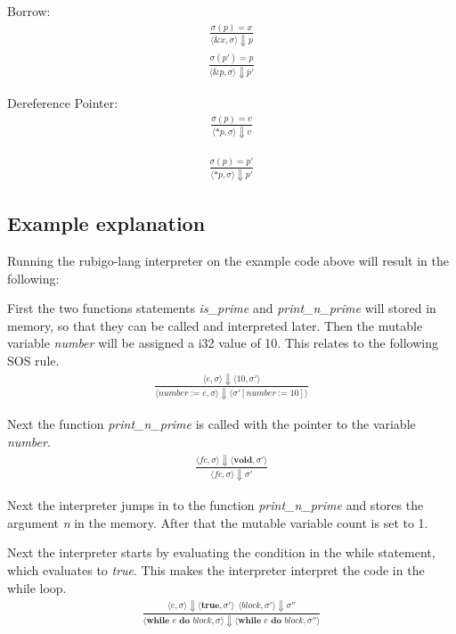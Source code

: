 \documentclass[12pt]{article}
\begin{document}
	Borrow:
	\begin{align*}
		\frac{\sigma(p) = x}
		{\langle \&x, \sigma \rangle\Downarrow p}
	\end{align*}
	\begin{align*}
		\frac{\sigma(p') = p}
		{\langle \&p, \sigma \rangle\Downarrow p'}
	\end{align*}

	Dereference Pointer:
	\begin{align*}
		\frac{\sigma(p) = v}
		{\langle *p, \sigma \rangle\Downarrow v}
	\end{align*}

	\begin{align*}
		\frac{\sigma(p) = p'}
		{\langle *p, \sigma \rangle\Downarrow p'}
	\end{align*}	


    \subsection{Example explanation}
	Running the rubigo-lang interpreter on the example code above will result in the following:

	First the two functions statements \emph{is\_prime} and \emph{print\_n\_prime} will stored in memory, so that they can be called and interpreted later. Then the mutable variable \emph{number} will be assigned a i32 value of 10. This relates to the following SOS rule.
	\begin{align*}
		\frac{\langle e, \sigma \rangle\Downarrow \langle 10, \sigma' \rangle}
		{\langle number := e, \sigma \rangle\Downarrow \langle \sigma' [number := 10] \rangle}
	\end{align*}

	Next the function \emph{print\_n\_prime} is called with the pointer to the variable \emph{number}.
	\begin{align*}
		\frac{\langle fc, \sigma \rangle\Downarrow \langle \textbf{void}, \sigma' \rangle}
		{\langle fc, \sigma \rangle\Downarrow \sigma'}
	\end{align*}

	Next the interpreter jumps in to the function \emph{print\_n\_prime} and stores the argument \emph{n} in the memory. After that the mutable variable count is set to 1.

	Next the interpreter starts by evaluating the condition in the while statement, which evaluates to \emph{true}. This makes the interpreter interpret the code in the while loop.
	\begin{align*}
		\frac{\langle e, \sigma \rangle\Downarrow \langle \textbf{true}, \sigma' \rangle \ \
		\langle block, \sigma' \rangle\Downarrow \sigma''}
		{\langle \textbf{while } e \textbf{ do } block, \sigma \rangle\Downarrow \langle \textbf{while } e \textbf{ do } block, \sigma'' \rangle}
	\end{align*}
\end{document}
